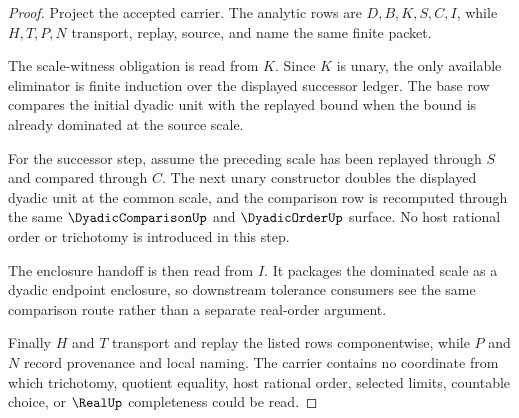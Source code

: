\begin{proof}
Project the accepted carrier. The analytic rows are $D,B,K,S,C,I$, while $H,T,P,N$ transport, replay, source, and name the same finite packet.

The scale-witness obligation is read from $K$. Since $K$ is unary, the only available eliminator is finite induction over the displayed successor ledger. The base row compares the initial dyadic unit with the replayed bound when the bound is already dominated at the source scale.

For the successor step, assume the preceding scale has been replayed through $S$ and compared through $C$. The next unary constructor doubles the displayed dyadic unit at the common scale, and the comparison row is recomputed through the same $\DyadicComparisonUp$ and $\DyadicOrderUp$ surface. No host rational order or trichotomy is introduced in this step.

The enclosure handoff is then read from $I$. It packages the dominated scale as a dyadic endpoint enclosure, so downstream tolerance consumers see the same comparison route rather than a separate real-order argument.

Finally $H$ and $T$ transport and replay the listed rows componentwise, while $P$ and $N$ record provenance and local naming. The carrier contains no coordinate from which trichotomy, quotient equality, host rational order, selected limits, countable choice, or $\RealUp$ completeness could be read.
\end{proof}

